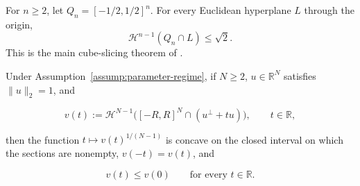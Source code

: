 \begin{theorem}\label{thm:ball-cube-slicing}
For $n\geq2$, let $Q_n=[-1/2,1/2]^n$. For every Euclidean hyperplane $L$ through the origin,
\begin{equation}
\label{eq:appendix-display-149}
\mathcal H^{n-1}(Q_n\cap L)\leq\sqrt2.
\end{equation}
This is the main cube-slicing theorem of \citet{ball1986cube}.
\end{theorem}

\begin{lemma}
\label{lem:step-005-central-maximality}
Under Assumption~\ref{assump:parameter-regime}, if \(N\geq2\), \(u\in\mathbb R^N\) satisfies \(\|u\|_2=1\), and

\begin{equation}
\label{eq:appendix-display-150}
v(t):=\mathcal H^{N-1}\bigl([-R,R]^N\cap(u^\perp+tu)\bigr),
\qquad t\in\mathbb R,
\end{equation}

then the function \(t\mapsto v(t)^{1/(N-1)}\) is concave on the closed interval on which the sections are nonempty, \(v(-t)=v(t)\), and

\begin{equation}
\label{eq:appendix-display-151}
v(t)\leq v(0)\qquad\text{for every }t\in\mathbb R.
\end{equation}


\end{lemma}

